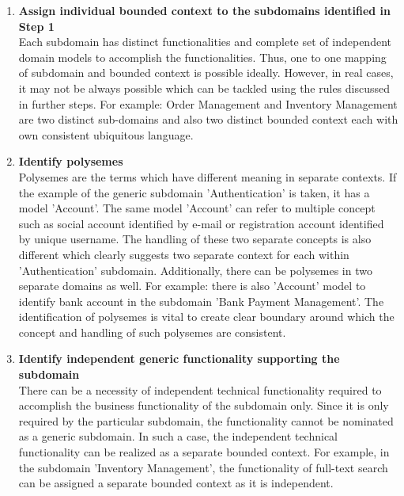 \begin{enumerate}
\item \textbf{Assign individual bounded context to the subdomains identified in Step 1}
\\
Each subdomain has distinct functionalities and complete set of independent domain models to accomplish the functionalities. Thus, one to one mapping of subdomain and bounded context is possible ideally. However, in real cases, it may not be always possible which can be tackled using the rules discussed in further steps. For example: Order Management and Inventory Management are two distinct sub-domains and also two distinct bounded context each with own consistent ubiquitous language. \cite{Fowler:2014ab}\cite{Gorodinski:2013aa}
\\
\item \textbf{Identify polysemes}
\\
Polysemes are the terms which have different meaning in separate contexts. If the example of the generic subdomain 'Authentication' is taken,  it has a model 'Account'. The same model 'Account' can refer to multiple concept such as social account identified by e-mail or registration account identified by unique username. The handling of these two separate concepts is also different which clearly suggests two separate context for each within 'Authentication' subdomain. Additionally, there can be polysemes in two separate domains as well. For example: there is also 'Account' model to identify bank account in the subdomain 'Bank Payment Management'. The identification of polysemes is vital to create clear boundary around which the concept and handling of such polysemes are consistent. \cite{Fowler:2014ab}
\\
\item \textbf{Identify independent generic functionality supporting the subdomain}
\\
There can be a necessity of independent technical functionality required to accomplish the business functionality of the subdomain only. Since it is only required by the particular subdomain, the functionality cannot be nominated as a generic subdomain. In such a case, the independent technical functionality can be realized as a separate bounded context. For example, in the subdomain 'Inventory Management', the functionality of full-text search can be assigned a separate bounded context as it is independent.\cite{Gorodinski:2013aa}
\end{enumerate}
\\
